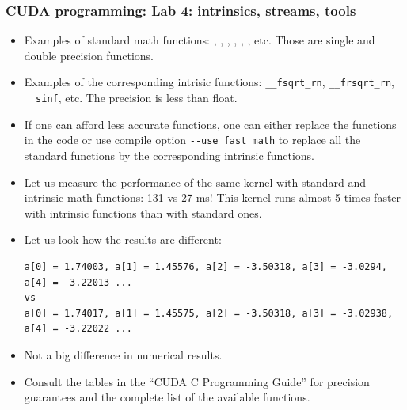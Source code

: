 \begin{frame}[fragile]
  \frametitle{CUDA programming: Lab 4: intrinsics, streams, tools}
\begin{itemize}
\item Examples of standard math functions: , , , , , , etc. Those are single and double precision functions.
\item Examples of the corresponding intrisic functions: {\color{mycolorcode}\verb|__fsqrt_rn|}, {\color{mycolorcode}\verb|__frsqrt_rn|}, {\color{mycolorcode}\verb|__sinf|}, etc. The precision is less than float.
\item If one can afford less accurate functions, one can either replace the functions in the code or use compile option {\color{mycolorcli}\verb|--use_fast_math|} to replace all the standard functions by the corresponding intrinsic 
  functions.
\item Let us measure the performance of the same kernel with standard and intrinsic math functions: 131 vs 27 ms! This kernel runs almost 5 times faster with intrinsic functions than with standard ones.
\item Let us look how the results are different:
{\tiny
{\color{mycolorcli}
\begin{verbatim}
a[0] = 1.74003, a[1] = 1.45576, a[2] = -3.50318, a[3] = -3.0294, a[4] = -3.22013 ...
vs
a[0] = 1.74017, a[1] = 1.45575, a[2] = -3.50318, a[3] = -3.02938, a[4] = -3.22022 ...
\end{verbatim}
}
}
\item Not a big difference in numerical results.
\item Consult the tables in the ``CUDA C Programming Guide'' for precision guarantees and the complete list of the available functions.
\end{itemize}
\end{frame}


